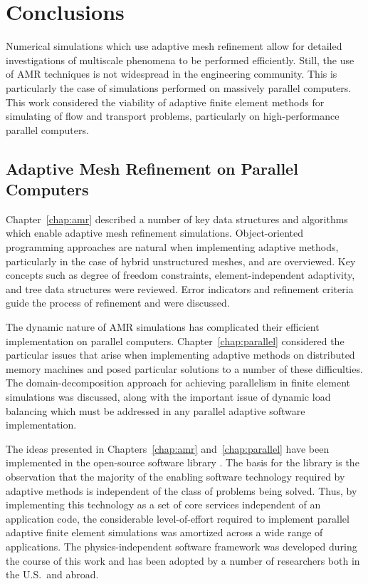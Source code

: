 \chapter{Conclusions\label{chap:conclusions}}

Numerical simulations which use adaptive mesh refinement  allow for detailed investigations of multiscale phenomena to be performed efficiently.  Still, the use of AMR techniques is not widespread in the engineering community.  This is particularly the case of simulations performed on massively parallel computers. This work considered the viability of adaptive finite element methods for simulating of flow and transport problems, particularly on high-performance parallel computers.


\section{Adaptive Mesh Refinement on Parallel Computers}
Chapter~\ref{chap:amr} described a number of key data structures and algorithms which enable adaptive mesh refinement simulations.  Object-oriented programming approaches are natural when implementing adaptive methods, particularly in the case of hybrid unstructured meshes, and are overviewed. Key concepts such as degree of freedom constraints, element-independent adaptivity, and tree data structures were reviewed.  Error indicators and refinement criteria guide the process of refinement and were discussed.

The dynamic nature of AMR simulations has complicated their efficient implementation on parallel computers. Chapter~\ref{chap:parallel} considered the particular issues that arise when implementing adaptive methods on distributed memory machines and posed particular solutions to a number of these difficulties.  The domain-decomposition approach for achieving parallelism in finite element simulations was discussed, along with the important issue of dynamic load balancing which must be addressed in any parallel adaptive software implementation.  

The ideas presented in Chapters~\ref{chap:amr} and~\ref{chap:parallel} have been implemented in the open-source software library \libMesh{}.  The basis for the library is the observation that the majority of the enabling software technology required by adaptive methods is independent of the class of problems being solved.  Thus, by implementing this technology as a set of core services independent of an application code, the considerable level-of-effort required to implement parallel adaptive finite element simulations was amortized across a wide range of applications. The physics-independent software framework \libMesh{} was developed during the course of this work and has been adopted by a number of researchers both in the U.S.\ and abroad.  

